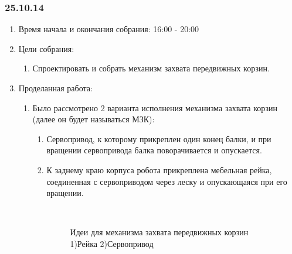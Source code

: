 
\subsubsection{25.10.14}

\begin{enumerate}
	\item Время начала и окончания собрания:
	16:00 - 20:00
	\item Цели собрания:
	\begin{enumerate}
	  \item Спроектировать и собрать механизм захвата передвижных корзин.
	  
    \end{enumerate}
    
	\item Проделанная работа:
	\begin{enumerate}
	  \item Было рассмотрено 2 варианта исполнения механизма захвата корзин (далее он будет называться МЗК):
	  \begin{enumerate}
	    \item Сервопривод, к которому прикреплен один конец балки, и при вращении сервопривода балка поворачивается и опускается.
	    
	    \item К заднему краю корпуса робота прикреплена мебельная рейка, соединенная с сервоприводом через леску и опускающаяся при его вращении.
	    
	    \begin{figure}[H]
	    	\begin{minipage}[h]{0.2\linewidth}
	    		\center   
	    	\end{minipage}
	    	\begin{minipage}[h]{0.6\linewidth}
	    		\caption{Идеи для механизма захвата передвижных корзин 1)Рейка 2)Сервопривод}
	    	\end{minipage}
	    \end{figure}
	    

\end{enumerate}
\end{enumerate}
\end{enumerate}
